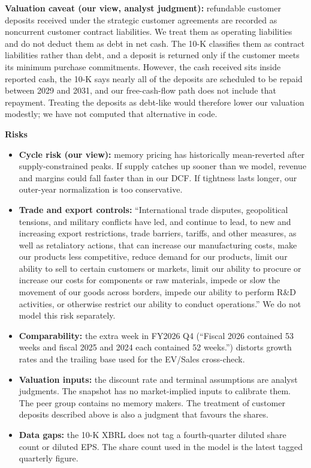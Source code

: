 \documentclass[a4paper,10pt]{article}
\begin{document}
\textbf{Valuation caveat (our view, analyst judgment):} refundable customer deposits received under the strategic customer agreements are recorded as noncurrent customer contract liabilities. We treat them as operating liabilities and do not deduct them as debt in net cash. The 10-K classifies them as contract liabilities rather than debt, and a deposit is returned only if the customer meets its minimum purchase commitments. However, the cash received sits inside reported cash, the 10-K says nearly all of the deposits are scheduled to be repaid between 2029 and 2031, and our free-cash-flow path does not include that repayment. Treating the deposits as debt-like would therefore lower our valuation modestly; we have not computed that alternative in code.

\par\smallskip\textbf{\color{MemoBlue}Risks}\par

\begin{itemize}\setlength{\itemsep}{1pt}
\item \textbf{Cycle risk (our view):} memory pricing has historically mean-reverted after supply-constrained peaks. If supply catches up sooner than we model, revenue and margins could fall faster than in our DCF. If tightness lasts longer, our outer-year normalization is too conservative.
\item \textbf{Trade and export controls:} “International trade disputes, geopolitical tensions, and military conflicts have led, and continue to lead, to new and increasing export restrictions, trade barriers, tariffs, and other measures, as well as retaliatory actions, that can increase our manufacturing costs, make our products less competitive, reduce demand for our products, limit our ability to sell to certain customers or markets, limit our ability to procure or increase our costs for components or raw materials, impede or slow the movement of our goods across borders, impede our ability to perform R\&D activities, or otherwise restrict our ability to conduct operations.” We do not model this risk separately.
\item \textbf{Comparability:} the extra week in FY2026 Q4 (“Fiscal 2026 contained 53 weeks and fiscal 2025 and 2024 each contained 52 weeks.”) distorts growth rates and the trailing base used for the EV/Sales cross-check.
\item \textbf{Valuation inputs:} the discount rate and terminal assumptions are analyst judgments. The snapshot has no market-implied inputs to calibrate them. The peer group contains no memory makers. The treatment of customer deposits described above is also a judgment that favours the shares.
\item \textbf{Data gaps:} the 10-K XBRL does not tag a fourth-quarter diluted share count or diluted EPS. The share count used in the model is the latest tagged quarterly figure.
\end{itemize}
\end{document}
